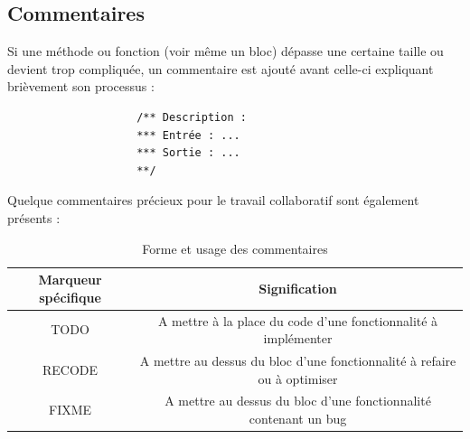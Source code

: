 \documentclass[a4paper]{memoir}
\begin{document}
			\subsection{Commentaires}
				Si une méthode ou fonction (voir même un bloc) dépasse une certaine taille ou devient trop compliquée, un commentaire est ajouté avant 
				celle-ci expliquant brièvement son processus :
				\begin{verbatim}
					/** Description :
					*** Entrée : ...
					*** Sortie : ...
					**/
				\end{verbatim}
				Quelque commentaires précieux pour le travail collaboratif sont également présents :
				\begin{table}[H]
					\begin{small}
						\hspace{-0,5cm}
						\begin{tabular}{| c | c |}
							\hline
							\textbf{Marqueur spécifique} & \textbf{Signification}\\
							\hline
							TODO & A mettre à la place du code d'une fonctionnalité à implémenter\\
							\hline
							RECODE & A mettre au dessus du bloc d'une fonctionnalité à refaire ou à optimiser\\
							\hline
							FIXME & A mettre au dessus du bloc d'une fonctionnalité contenant un bug\\
							\hline
						\end{tabular}
					\end{small}
					\label{tab:commentaire}
					\caption{Forme et usage des commentaires}
				\end{table}
\end{document}
